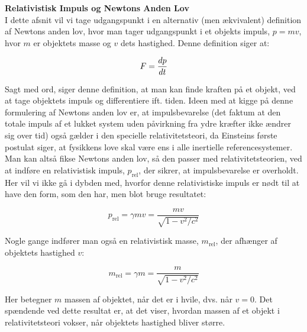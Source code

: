 \noindent
\textbf{Relativistisk Impuls og Newtons Anden Lov}\\


I dette afsnit vil vi tage udgangspunkt i en alternativ (men ækvivalent) definition af Newtons anden lov, hvor man tager udgangspunkt i et objekts impuls, $p=mv$, hvor $m$ er objektets masse og $v$ dets hastighed. Denne definition siger at:

\begin{equation}
F =  {d{p} \over d{t}}
\label{newton2}
\end{equation}


\vspace{2mm}

Sagt med ord, siger denne definition, at man kan finde kraften på et objekt, ved at tage objektets impuls og differentiere ift. tiden. Ideen med at kigge på denne formulering af Newtons anden lov er, at impulsbevarelse (det faktum at den totale impuls af et lukket system uden påvirkning fra ydre kræfter ikke ændrer sig over tid) også gælder i den specielle relativitetsteori, da Einsteins første postulat siger, at fysikkens love skal være ens i alle inertielle referencesystemer. Man kan altså fikse Newtons anden lov, så den passer med relativitetsteorien, ved at indføre en relativistisk impuls, $p_{\text{rel}}$, der sikrer, at impulsbevarelse er overholdt. Her vil vi ikke gå i dybden med, hvorfor denne relativistiske impuls er nødt til at have den form, som den har, men blot bruge resultatet:  



\begin{equation}
p_{\text{rel}} = \gamma m v =  \frac{m v}{\sqrt{1 - v^2 / c^2}}
\label{impuls}
\end{equation}

\vspace{2mm}

Nogle gange indfører man også en relativistisk masse, $m_{\text{rel}}$, der afhænger af objektets hastighed $v$:

\begin{equation}
m_{\text{rel}} = \gamma m = \frac{m}{\sqrt{1 - v^2 / c^2}}
\label{masse}
\end{equation}

\vspace{2mm}

Her betegner $m$ massen af objektet, når det er i hvile, dvs. når $v=0$. Det spændende ved dette resultat er, at det viser, hvordan massen af et objekt i relativitetsteori vokser, når objektets hastighed bliver større.\\

